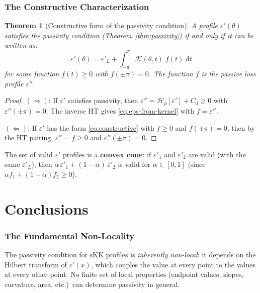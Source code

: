 \documentclass[11pt]{article}
\newtheorem{theorem}{Theorem}
\newcommand{\eps}{\varepsilon}
\newcommand{\Hp}{\mathcal{H}_p}
\newcommand{\dd}{\mathrm{d}}
\newcommand{\K}{\mathcal{K}}
\begin{document}
\section{The Constructive Characterization}

\begin{theorem}[Constructive form of the passivity condition]\label{thm:constructive}
A profile $\eps'(\theta)$ satisfies the passivity condition (Theorem~\ref{thm:passivity}) if and only if it can be written as:
\begin{equation}\label{eq:constructive}
\eps'(\theta) = \eps'_L + \int_{-\pi}^{\pi}\K(\theta, t)\;f(t)\;\dd t
\end{equation}
for some function $f(t) \geq 0$ with $f(\pm\pi) = 0$.  The function $f$ is the passive loss profile $\eps''$.
\end{theorem}

\begin{proof}
$(\Longrightarrow)$: If $\eps'$ satisfies passivity, then $\eps'' = \Hp[\eps'] + C_0 \geq 0$ with $\eps''(\pm\pi) = 0$.  The inverse HT gives \eqref{eq:eps-from-kernel} with $f = \eps''$.

$(\Longleftarrow)$: If $\eps'$ has the form \eqref{eq:constructive} with $f \geq 0$ and $f(\pm\pi) = 0$, then by the HT pairing, $\eps'' = f \geq 0$ and $\eps''(\pm\pi) = 0$.
\end{proof}

The set of valid $\eps'$ profiles is a \textbf{convex cone}: if $\eps'_1$ and $\eps'_2$ are valid (with the same $\eps'_L$), then $\alpha\,\eps'_1 + (1-\alpha)\,\eps'_2$ is valid for $\alpha \in [0,1]$ (since $\alpha f_1 + (1-\alpha)f_2 \geq 0$).


\part{Conclusions}

\section{The Fundamental Non-Locality}

The passivity condition for sKK profiles is \emph{inherently non-local}: it depends on the Hilbert transform of $\eps'(x)$, which couples the value at every point to the values at every other point.  No finite set of local properties (endpoint values, slopes, curvature, area, etc.)\ can determine passivity in general.
\end{document}
